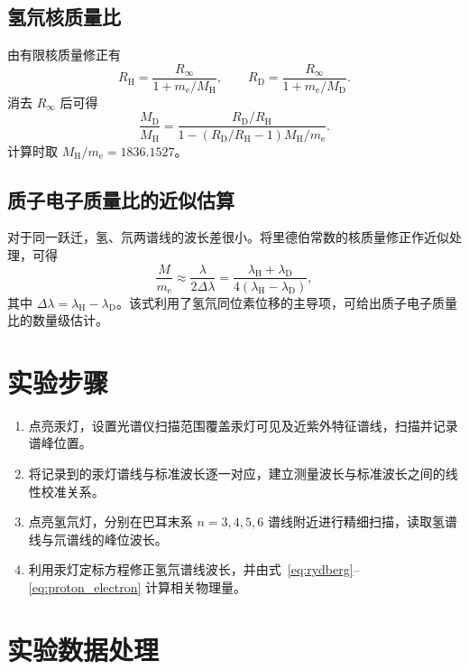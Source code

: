 \documentclass[12pt,a4paper]{article}
\begin{document}
\subsection{氢氘核质量比}
由有限核质量修正有
\begin{equation}
    R_{\mathrm H}=\frac{R_\infty}{1+m_{\mathrm e}/M_{\mathrm H}},\qquad
    R_{\mathrm D}=\frac{R_\infty}{1+m_{\mathrm e}/M_{\mathrm D}}.
\end{equation}
消去 $R_\infty$ 后可得
\begin{equation}
    \frac{M_{\mathrm D}}{M_{\mathrm H}}
    =\frac{R_{\mathrm D}/R_{\mathrm H}}
    {1-\left(R_{\mathrm D}/R_{\mathrm H}-1\right)M_{\mathrm H}/m_{\mathrm e}}.
    \label{eq:mass_ratio}
\end{equation}
计算时取 $M_{\mathrm H}/m_{\mathrm e}=1836.1527$。

\subsection{质子电子质量比的近似估算}
对于同一跃迁，氢、氘两谱线的波长差很小。将里德伯常数的核质量修正作近似处理，可得
\begin{equation}
    \frac{M}{m_{\mathrm e}}\approx\frac{\lambda}{2\Delta\lambda}
    =\frac{\lambda_{\mathrm H}+\lambda_{\mathrm D}}{4(\lambda_{\mathrm H}-\lambda_{\mathrm D})},
    \label{eq:proton_electron}
\end{equation}
其中 $\Delta\lambda=\lambda_{\mathrm H}-\lambda_{\mathrm D}$。该式利用了氢氘同位素位移的主导项，可给出质子电子质量比的数量级估计。

\section{实验步骤}
\begin{enumerate}
    \item 点亮汞灯，设置光谱仪扫描范围覆盖汞灯可见及近紫外特征谱线，扫描并记录谱峰位置。
    \item 将记录到的汞灯谱线与标准波长逐一对应，建立测量波长与标准波长之间的线性校准关系。
    \item 点亮氢氘灯，分别在巴耳末系 $n=3,4,5,6$ 谱线附近进行精细扫描，读取氢谱线与氘谱线的峰位波长。
    \item 利用汞灯定标方程修正氢氘谱线波长，并由式~\eqref{eq:rydberg}--\eqref{eq:proton_electron} 计算相关物理量。
\end{enumerate}

\section{实验数据处理}
\end{document}
